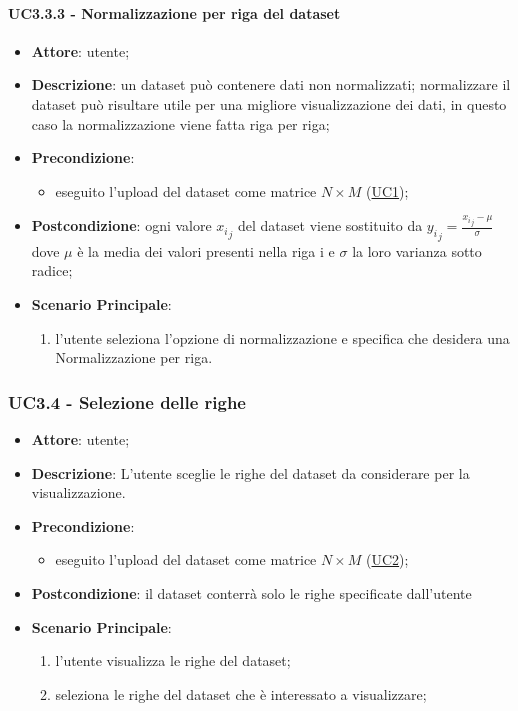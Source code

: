     \paragraph{UC3.3.3 - Normalizzazione per riga del dataset}
    \label{uc3.3.3}
    \begin{itemize}
    \item \textbf{Attore}: utente;
    \item \textbf{Descrizione}: un dataset può contenere dati non normalizzati; normalizzare il dataset può risultare utile per una migliore visualizzazione dei dati, in questo caso la normalizzazione viene fatta riga per riga;
    \item \textbf{Precondizione}: 
    \begin{itemize}
        \item eseguito l'upload del dataset come matrice $N\times M$ (\hyperref[uc1]{UC1});
    \end{itemize}  
    \item \textbf{Postcondizione}: ogni valore ${x_i}_j$ del dataset viene sostituito da $ {y_i}_j = \frac{{x_i}_j - \mu}{\sigma}$ dove $\mu$ è la media dei valori presenti nella riga i e $\sigma$ la loro varianza sotto radice;
    \item \textbf{Scenario Principale}: 
    \begin{enumerate}
        \item l'utente seleziona l'opzione di normalizzazione e specifica che desidera una Normalizzazione per riga.
    \end{enumerate}  
    \end{itemize}
    
    \subsubsection{UC3.4 - Selezione delle righe}
    \label{uc3.4}
    \begin{itemize}
    \item \textbf{Attore}: utente;
    \item \textbf{Descrizione}: L'utente sceglie le righe del dataset da considerare per la visualizzazione.
    \item \textbf{Precondizione}:
    \begin{itemize}
        \item eseguito l'upload del dataset come matrice $N\times M$ (\hyperref[uc2]{UC2});
    \end{itemize}
    \item \textbf{Postcondizione}: il dataset conterrà solo le righe specificate dall'utente
    \item \textbf{Scenario Principale}: 
    \begin{enumerate}
        \item l'utente visualizza le righe del dataset;
        \item seleziona le righe del dataset che è interessato a visualizzare;
    \end{enumerate}  
    \end{itemize}
    
